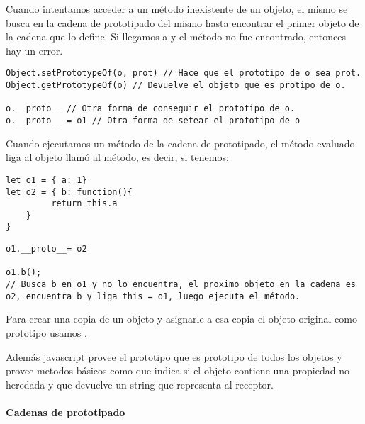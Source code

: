 Cuando intentamos acceder a un método inexistente de un objeto, el mismo se busca en la cadena de prototipado del mismo hasta encontrar el primer objeto de la cadena que lo define. Si llegamos a  y el método no fue encontrado, entonces hay un error.

\begin{centrado}
\begin{verbatim}
Object.setPrototypeOf(o, prot) // Hace que el prototipo de o sea prot.
Object.getPrototypeOf(o) // Devuelve el objeto que es protipo de o.

o.__proto__ // Otra forma de conseguir el prototipo de o.
o.__proto__ = o1 // Otra forma de setear el prototipo de o
\end{verbatim}
\end{centrado}

Cuando ejecutamos un método de la cadena de prototipado, el método evaluado liga  al objeto llamó al método, es decir, si tenemos:

\begin{centrado}
\begin{verbatim}
let o1 = { a: 1}
let o2 = { b: function(){
         return this.a
    }
}
\end{verbatim}
\end{centrado}
\begin{centrado}
\begin{verbatim}
o1.__proto__= o2

o1.b();
// Busca b en o1 y no lo encuentra, el proximo objeto en la cadena es o2, encuentra b y liga this = o1, luego ejecuta el método.
\end{verbatim}
\end{centrado}

Para crear una copia de un objeto y asignarle a esa copia el objeto original como prototipo usamos .

Además javascript provee el prototipo  que es prototipo de todos los objetos y provee metodos básicos como  que indica si el objeto contiene una propiedad no heredada y  que devuelve un string que representa al receptor.

\paragraph{Cadenas de prototipado}

